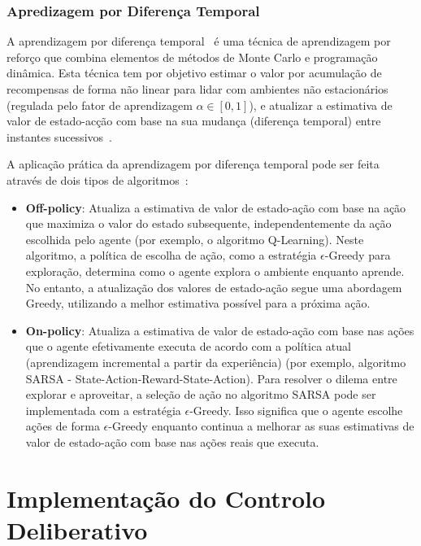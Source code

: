 \subsubsection{Apredizagem por Diferença Temporal}\label{subsubsec:aprendizagem-por-diferenca-temporal}

A aprendizagem por diferença temporal~\cite{wiki:temporal-difference-learning} é uma técnica de aprendizagem por reforço que combina elementos de métodos de Monte Carlo e programação dinâmica.
Esta técnica tem por objetivo estimar o valor por acumulação de recompensas de forma
não linear para lidar com ambientes não estacionários (regulada pelo fator de aprendizagem $\alpha \in [0,1]$), e atualizar a estimativa de valor de estado-acção com base na sua mudança (diferença temporal) entre instantes sucessivos~\cite{isel:iasa:slides:aprendizagem-por-reforco}.

A aplicação prática da aprendizagem por diferença temporal pode ser feita através de dois tipos de algoritmos~\cite{q-learning-algorithm}:

\begin{itemize}
    \item \textbf{Off-policy}:
    Atualiza a estimativa de valor de estado-ação com base na ação que maximiza o valor do estado subsequente, independentemente da ação escolhida pelo agente (por exemplo, o algoritmo Q-Learning).
    Neste algoritmo, a política de escolha de ação, como a estratégia $\epsilon$-Greedy para exploração, determina como o agente explora o ambiente enquanto aprende.
    No entanto, a atualização dos valores de estado-ação segue uma abordagem Greedy, utilizando a melhor estimativa possível para a próxima ação.
    \item \textbf{On-policy}: Atualiza a estimativa de valor de estado-ação com base nas ações que o agente efetivamente executa de acordo com a política atual (aprendizagem incremental a partir da experiência) (por exemplo, algoritmo SARSA - State-Action-Reward-State-Action).
    Para resolver o dilema entre explorar e aproveitar, a seleção de ação no algoritmo SARSA pode ser implementada com a estratégia $\epsilon$-Greedy.
    Isso significa que o agente escolhe ações de forma $\epsilon$-Greedy enquanto continua a melhorar as suas estimativas de valor de estado-ação com base nas ações reais que executa.
\end{itemize}


\section{Implementação do Controlo Deliberativo}\label{sec:implementacao-controlo-deliberativo}

